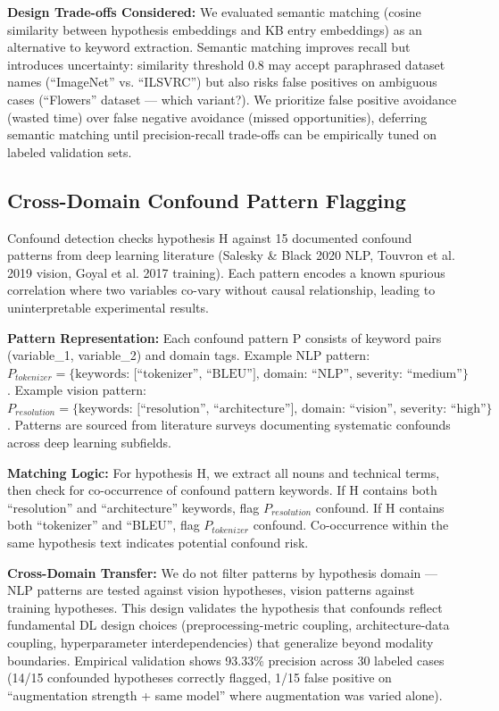 \textbf{Design Trade-offs Considered:} We evaluated semantic matching (cosine similarity between hypothesis embeddings and KB entry embeddings) as an alternative to keyword extraction. Semantic matching improves recall but introduces uncertainty: similarity threshold 0.8 may accept paraphrased dataset names (``ImageNet'' vs. ``ILSVRC'') but also risks false positives on ambiguous cases (``Flowers'' dataset --- which variant?). We prioritize false positive avoidance (wasted time) over false negative avoidance (missed opportunities), deferring semantic matching until precision-recall trade-offs can be empirically tuned on labeled validation sets.

\subsection{Cross-Domain Confound Pattern Flagging}

Confound detection checks hypothesis H against 15 documented confound patterns from deep learning literature (Salesky \& Black 2020 NLP, Touvron et al. 2019 vision, Goyal et al. 2017 training). Each pattern encodes a known spurious correlation where two variables co-vary without causal relationship, leading to uninterpretable experimental results.

\textbf{Pattern Representation:} Each confound pattern P consists of keyword pairs (variable\_1, variable\_2) and domain tags. Example NLP pattern: $P_{tokenizer} = \{\text{keywords: [``tokenizer'', ``BLEU''], domain: ``NLP'', severity: ``medium''}\}$. Example vision pattern: $P_{resolution} = \{\text{keywords: [``resolution'', ``architecture''], domain: ``vision'', severity: ``high''}\}$. Patterns are sourced from literature surveys documenting systematic confounds across deep learning subfields.

\textbf{Matching Logic:} For hypothesis H, we extract all nouns and technical terms, then check for co-occurrence of confound pattern keywords. If H contains both ``resolution'' and ``architecture'' keywords, flag $P_{resolution}$ confound. If H contains both ``tokenizer'' and ``BLEU'', flag $P_{tokenizer}$ confound. Co-occurrence within the same hypothesis text indicates potential confound risk.

\textbf{Cross-Domain Transfer:} We do not filter patterns by hypothesis domain --- NLP patterns are tested against vision hypotheses, vision patterns against training hypotheses. This design validates the hypothesis that confounds reflect fundamental DL design choices (preprocessing-metric coupling, architecture-data coupling, hyperparameter interdependencies) that generalize beyond modality boundaries. Empirical validation shows 93.33\% precision across 30 labeled cases (14/15 confounded hypotheses correctly flagged, 1/15 false positive on ``augmentation strength + same model'' where augmentation was varied alone).

